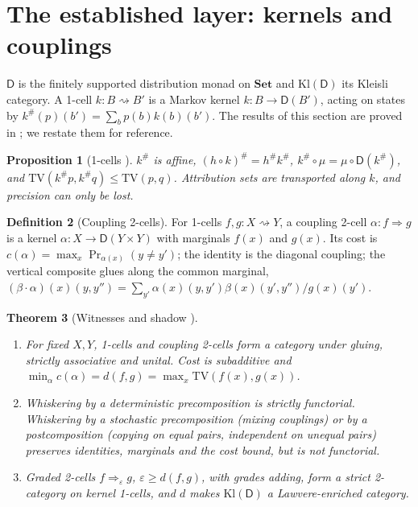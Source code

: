 \documentclass[11pt]{article}
\newtheorem{theorem}{Theorem}[section]
\newtheorem{proposition}[theorem]{Proposition}
\theoremstyle{definition}
\newtheorem{definition}[theorem]{Definition}
\theoremstyle{remark}
\newcommand{\D}{\mathsf{D}}
\newcommand{\Kl}{\mathrm{Kl}}
\newcommand{\TV}{\mathrm{TV}}
\begin{document}
\section{The established layer: kernels and couplings}\label{sec:established}

$\D$ is the finitely supported distribution monad on $\mathbf{Set}$ and $\Kl(\D)$ its Kleisli category.
A 1-cell $k\colon B\rightsquigarrow B'$ is a Markov kernel $k\colon B\to\D(B')$, acting on states by
$k^\#(p)(b')=\sum_bp(b)k(b)(b')$. The results of this section are proved in
\cite[\S7]{Awasthi-Attribution}; we restate them for reference.

\begin{proposition}[1-cells {\cite[Props.~7.2, 7.3]{Awasthi-Attribution}}]\label{prop:1cells}
$k^\#$ is affine, $(h\circ k)^\#=h^\#k^\#$, $k^\#\circ\mu=\mu\circ\D(k^\#)$, and
$\TV(k^\#p,k^\#q)\le\TV(p,q)$. Attribution sets are transported along $k$, and precision can only be lost.
\end{proposition}

\begin{definition}[Coupling 2-cells]\label{def:coupling}
For 1-cells $f,g\colon X\rightsquigarrow Y$, a coupling 2-cell $\alpha\colon f\Rightarrow g$ is a kernel
$\alpha\colon X\to\D(Y\times Y)$ with marginals $f(x)$ and $g(x)$. Its cost is
$c(\alpha)=\max_x\Pr_{\alpha(x)}(y\ne y')$; the identity is the diagonal coupling; the vertical
composite glues along the common marginal,
$(\beta\cdot\alpha)(x)(y,y'')=\sum_{y'}\alpha(x)(y,y')\beta(x)(y',y'')/g(x)(y')$.
\end{definition}

\begin{theorem}[Witnesses and shadow {\cite[Thms.~7.6, 7.8]{Awasthi-Attribution}}]\label{thm:witness}
\leavevmode
\begin{enumerate}[label=(\roman*)]
\item For fixed $X,Y$, 1-cells and coupling 2-cells form a category under gluing, strictly
  associative and unital. Cost is subadditive and $\min_\alpha c(\alpha)=d(f,g)=\max_x\TV(f(x),g(x))$.
\item Whiskering by a deterministic precomposition is strictly functorial. Whiskering by a stochastic
  precomposition (mixing couplings) or by a postcomposition (copying on equal pairs, independent on
  unequal pairs) preserves identities, marginals and the cost bound, but is not functorial.
\item Graded 2-cells $f\Rightarrow_\varepsilon g$, $\varepsilon\ge d(f,g)$, with grades adding, form a strict
  2-category on kernel 1-cells, and $d$ makes $\Kl(\D)$ a Lawvere-enriched category.
\end{enumerate}
\end{theorem}
\end{document}
